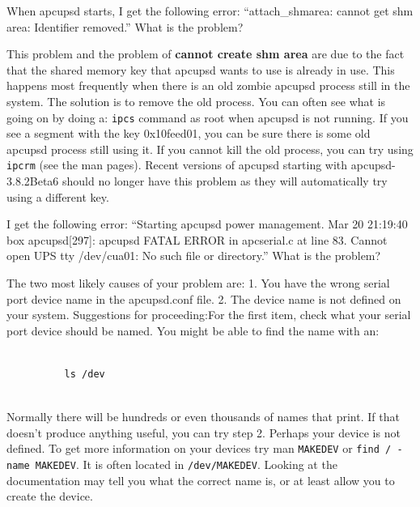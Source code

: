 {{{{{{{{{\begin{description}
{{{\item [Q:]
   When apcupsd starts, I get the following error: ``attach\_shmarea: cannot get
shm area: Identifier removed.'' What is the problem?  

\item [A:]
   This problem and the problem of {\bf cannot create shm area} are due to the
fact that the shared memory key that apcupsd wants to use is already in use.
This happens most frequently when there is an old zombie apcupsd process still
in the system.  The solution is to remove the old process.  You can often see
what is going on by doing a: {\tt ipcs} command as root when apcupsd is not
running. If you see a segment with the key 0x10feed01, you can be sure there
is some old apcupsd process still using it. If you cannot kill the old
process, you can try using {\tt ipcrm} (see the man pages).  Recent versions
of apcupsd starting with apcupsd-3.8.2Beta6 should no longer have this problem
as they will automatically try using a different key.  

\item [Q:]
   I get the following error: ``Starting apcupsd power management.  Mar 20
21:19:40 box apcupsd[297]: apcupsd FATAL ERROR in apcserial.c at line 83.
Cannot open UPS tty /dev/cua01: No such file or directory.'' What is the
problem?  

\item [A:]
   The two most likely causes of your problem are:  1. You have the wrong serial
port device name in the apcupsd.conf file. 2. The device name is not defined
on your system. Suggestions for proceeding:For the first item, check what your
serial port device should be named. You might be able to find the name with
an:  

\footnotesize
\begin{verbatim}
          
          ls /dev
     
\end{verbatim}
\normalsize

Normally there will be hundreds or even thousands of names that print. If that
doesn't produce anything useful, you can try step 2.  Perhaps your device is
not defined. To get more information on your devices try man {\tt MAKEDEV} or
{\tt find / -name MAKEDEV}.  It is often located in {\tt /dev/MAKEDEV}. 
Looking at the documentation may tell you what the correct name is, or at
least allow you to create the device.  

}}}
\end{description}}}}}}}}}}
